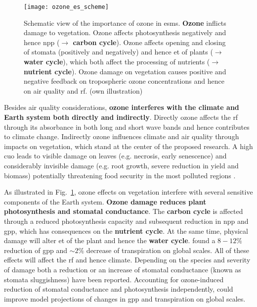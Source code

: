 \begin{figure}[!b]
  \centering
  \texttt{[image: ozone\_es\_scheme]}%
  \caption{Schematic view of the importance of ozone in \glspl{esm}. \textbf{\color{red}Ozone} inflicts damage to vegetation. Ozone affects photosynthesis negatively and hence \gls{npp} (\textbf{\color{darkgray}$\rightarrow$ carbon cycle}). Ozone affects opening and closing of stomata (positively and negatively) and hence \gls{et} of plants (\textbf{\color{blue}$\rightarrow$ water cycle}), which both affect the processing of nutrients (\textbf{\color{darkgray}$\rightarrow$ nutrient cycle}). Ozone damage on vegetation causes positive and negative feedback on tropospheric ozone concentrations and hence on air quality and \gls{rf}. (own illustration)}
  \label{fig:ozone_esm_scheme}
\end{figure}

Besides air quality considerations, \textbf{ozone interferes with the climate and Earth system both directly and indirectly}. Directly ozone affects the \gls{rf} through its absorbance in both long and short wave bands and hence contributes to climate change. Indirectly ozone influences climate and air quality through impacts on vegetation, which stand at the center of the proposed research. A high \gls{cuo} leads to visible damage on leaves (e.g. necrosis, early senescence) and considerably invisible damage (e.g. root growth, severe reduction in yield and biomass) potentially threatening food security in the most polluted regions \parencites{GCB:Mills2011}{PT:Emberson2020}.

As illustrated in Fig.~\ref{fig:ozone_esm_scheme}, ozone effects on vegetation interfere with several sensitive components of the Earth system. \textbf{Ozone damage reduces plant photosynthesis and stomatal conductance}. The \textbf{carbon cycle} is affected through a reduced photosynthesis capacity and subsequent reduction in \gls{npp} and \gls{gpp}, which has consequences on the \textbf{nutrient cycle}. At the same time, physical damage will alter \gls{et} of the plant and hence the \textbf{water cycle}. \textcite{GRL:Lombardozzi2015} found a $8-12\%$ reduction of \gls{gpp} and $\sim 2\%$ decrease of transpiration on global scales. All of these effects will affect the \gls{rf} and hence climate. Depending on the species and severity of damage both a reduction \parencite{Oe:Lombardozzi2012} or an increase of stomatal conductance (known as stomata sluggishness) \parencite{SR:Hoshika2015} have been reported. Accounting for ozone-induced reduction of stomatal conductance and photosynthesis independently, \textcite{BGS:Lombardozzi2012} could improve model projections of changes in \gls{gpp} and transpiration on global scales.

